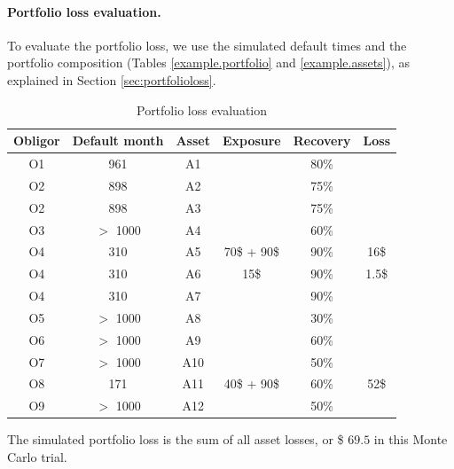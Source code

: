 \documentclass[a4paper,12pt,final]{article}
\begin{document}
\paragraph{Portfolio loss evaluation.} To evaluate the portfolio loss, 
we use the simulated default times and the portfolio composition (Tables 
\ref{example.portfolio} and \ref{example.assets}), as explained in Section 
\ref{sec:portfolioloss}.
{\small
\begin{table}[!hbt]
\begin{center}
\begin{tabular}[]{|c|c|c|c|c|c|}
Obligor  & Default month & Asset & Exposure    & Recovery & Loss  \\
\hline
O1       & 961           &  A1   &             &  80\%    &       \\
O2       & 898           &  A2   &             &  75\%    &       \\
O2       & 898           &  A3   &             &  75\%    &       \\
O3       & $>$ 1000      &  A4   &             &  60\%    &       \\
O4       & 310           &  A5   & 70\$ + 90\$ &  90\%    &  16\$ \\
O4       & 310           &  A6   & 15\$        &  90\%    & 1.5\$ \\
O4       & 310           &  A7   &             &  90\%    &       \\
O5       & $>$ 1000      &  A8   &             &  30\%    &       \\
O6       & $>$ 1000      &  A9   &             &  60\%    &       \\
O7       & $>$ 1000      &  A10  &             &  50\%    &       \\
O8       & 171           &  A11  & 40\$ + 90\$ &  60\%    &  52\$ \\
O9       & $>$ 1000      &  A12  &             &  50\%    &       \\
\end{tabular}
\caption{Portfolio loss evaluation}
\end{center}
\end{table}
}

The simulated portfolio loss is the sum of all asset losses, or \$ $69.5$ 
in this Monte Carlo trial. 

\FloatBarrier
\end{document}
